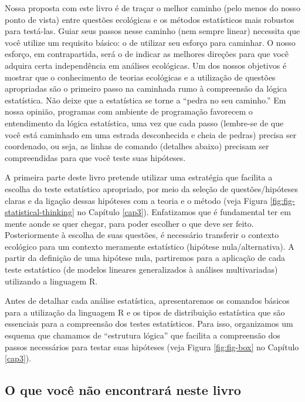 \documentclass[
]{article}
\begin{document}
Nossa proposta com este livro é de traçar o melhor caminho (pelo menos do nosso ponto de vista) entre questões ecológicas e os métodos estatísticos mais robustos para testá-las. Guiar seus passos nesse caminho (nem sempre linear) necessita que você utilize um requisito básico: o de utilizar seu esforço para caminhar. O nosso esforço, em contrapartida, será o de indicar as melhores direções para que você adquira certa independência em análises ecológicas. Um dos nossos objetivos é mostrar que o conhecimento de teorias ecológicas e a utilização de questões apropriadas são o primeiro passo na caminhada rumo à compreensão da lógica estatística. Não deixe que a estatística se torne a ``pedra no seu caminho.'' Em nossa opinião, programas com ambiente de programação favorecem o entendimento da lógica estatística, uma vez que cada passo (lembre-se de que você está caminhado em uma estrada desconhecida e cheia de pedras) precisa ser coordenado, ou seja, as linhas de comando (detalhes abaixo) precisam ser compreendidas para que você teste suas hipóteses.

A primeira parte deste livro pretende utilizar uma estratégia que facilita a escolha do teste estatístico apropriado, por meio da seleção de questões/hipóteses claras e da ligação dessas hipóteses com a teoria e o método (veja Figura \ref{fig:fig-statistical-thinking} no Capítulo \ref{cap3}). Enfatizamos que é fundamental ter em mente aonde se quer chegar, para poder escolher o que deve ser feito. Posteriormente à escolha de suas questões, é necessário transferir o contexto ecológico para um contexto meramente estatístico (hipótese nula/alternativa). A partir da definição de uma hipótese nula, partiremos para a aplicação de cada teste estatístico (de modelos lineares generalizados à análises multivariadas) utilizando a linguagem R.

Antes de detalhar cada análise estatística, apresentaremos os comandos básicos para a utilização da linguagem R e os tipos de distribuição estatística que são essenciais para a compreensão dos testes estatísticos. Para isso, organizamos um esquema que chamamos de ``estrutura lógica'' que facilita a compreensão dos passos necessários para testar suas hipóteses (veja Figura \ref{fig:fig-box} no Capítulo \ref{cap3}).

\hypertarget{o-que-vocuxea-nuxe3o-encontraruxe1-neste-livro}{%
\subsection{O que você não encontrará neste livro}\label{o-que-vocuxea-nuxe3o-encontraruxe1-neste-livro}}
\end{document}

